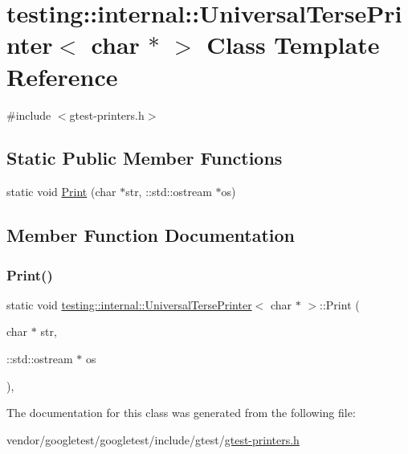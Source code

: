 \hypertarget{classtesting_1_1internal_1_1_universal_terse_printer_3_01char_01_5_01_4}{}\section{testing\+:\+:internal\+:\+:Universal\+Terse\+Printer$<$ char $\ast$ $>$ Class Template Reference}
\label{classtesting_1_1internal_1_1_universal_terse_printer_3_01char_01_5_01_4}


{\ttfamily \#include $<$gtest-\/printers.\+h$>$}

\subsection*{Static Public Member Functions}
\begin{DoxyCompactItemize}
\item 
static void \hyperlink{classtesting_1_1internal_1_1_universal_terse_printer_3_01char_01_5_01_4_aa9ef95587c1461fe33e254af52401a43}{Print} (char $\ast$str, \+::std\+::ostream $\ast$os)
\end{DoxyCompactItemize}


\subsection{Member Function Documentation}
\mbox{\label{classtesting_1_1internal_1_1_universal_terse_printer_3_01char_01_5_01_4_aa9ef95587c1461fe33e254af52401a43}} 
\subsubsection{\texorpdfstring{Print()}{Print()}}
{\footnotesize\ttfamily static void \hyperlink{classtesting_1_1internal_1_1_universal_terse_printer}{testing\+::internal\+::\+Universal\+Terse\+Printer}$<$ char $\ast$ $>$\+::Print (\begin{DoxyParamCaption}\item[{char $\ast$}]{str,  }\item[{\+::std\+::ostream $\ast$}]{os }\end{DoxyParamCaption})\hspace{0.3cm}{\ttfamily [inline]}, {\ttfamily [static]}}



The documentation for this class was generated from the following file\+:\begin{DoxyCompactItemize}
\item 
vendor/googletest/googletest/include/gtest/\hyperlink{gtest-printers_8h}{gtest-\/printers.\+h}\end{DoxyCompactItemize}
